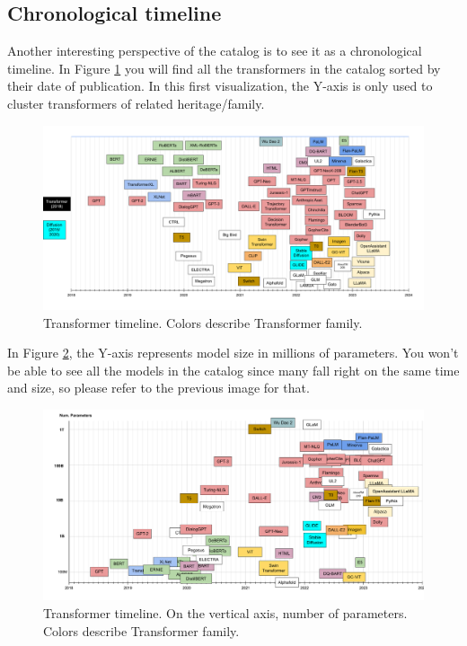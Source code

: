 \documentclass{article}
\begin{document}
\subsection{Chronological timeline}

Another interesting perspective of the catalog is to see it as a chronological timeline. In Figure \ref{fig:timeline} you will find all the transformers in the catalog sorted by their date of publication. In this first visualization, the Y-axis is only used to cluster transformers of related heritage/family.

\begin{figure}
    \centering
    \includegraphics[width=\textwidth,height=\textheight,keepaspectratio]{02-06.png}
    \caption{Transformer timeline. Colors describe Transformer family.}
    \label{fig:timeline}
\end{figure}

In Figure \ref{fig:timelineSize}, the Y-axis represents model size in millions of parameters. You won't be able to see all the models in the catalog since many fall right on the same time and size, so please refer to the previous image for that.

\begin{figure}
    \centering
    \includegraphics[width=\textwidth,height=\textheight,keepaspectratio]{02-09.png}
    \caption{Transformer timeline. On the vertical axis, number of parameters. Colors describe Transformer family.}
    \label{fig:timelineSize}
\end{figure}
\end{document}
